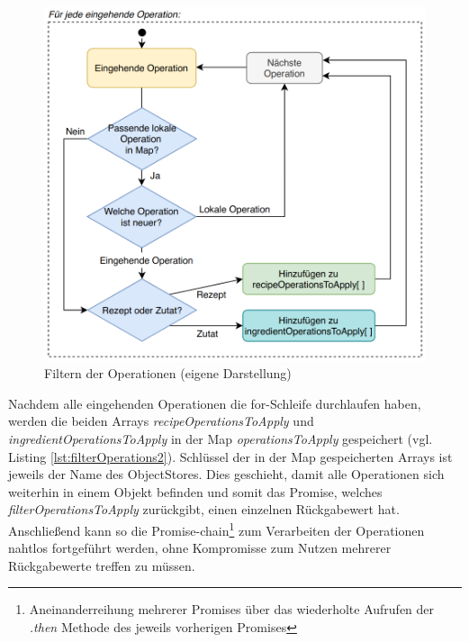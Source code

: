\documentclass[a4paper, 12pt]{scrreprt}
\begin{document}
\begin{minipage}{\linewidth}
	
\end{minipage}

\begin{figure}[H]
	\centering
	\includegraphics[width=.80\textwidth]{flowchartFilterOperations.png}
	\caption[Filtern der Operationen]{Filtern der Operationen (eigene Darstellung)}
	\label{fig:filterOperationsFlowchart}
\end{figure}

Nachdem alle eingehenden Operationen die for-Schleife durchlaufen haben, werden die beiden Arrays \textit{recipeOperationsToApply} und \textit{ingredientOperationsToApply} in der Map \textit{operationsToApply} gespeichert (vgl. Listing \ref{lst:filterOperations2}). Schlüssel der in der Map gespeicherten Arrays ist jeweils der Name des ObjectStores. Dies geschieht, damit alle Operationen sich weiterhin in einem Objekt befinden und somit das Promise, welches \textit{filterOperationsToApply} zurückgibt, einen einzelnen Rückgabewert hat. Anschließend kann so die Promise-chain\footnote{Aneinanderreihung mehrerer Promises über das wiederholte Aufrufen der \textit{.then} Methode des jeweils vorherigen Promises} zum Verarbeiten der Operationen nahtlos fortgeführt werden, ohne Kompromisse zum Nutzen mehrerer Rückgabewerte treffen zu müssen.

\begin{minipage}{\linewidth}
	
\end{minipage}
\end{document}
